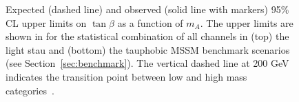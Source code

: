 \begin{figure}[!hp]
     \begin{center}
	
    \end{center}
    \caption{Expected (dashed line) and observed (solid line with markers) 95\% CL upper limits on $\tan\beta$ as a function of $m_A$. 
	The upper limits are shown in for the statistical combination of all channels in (top) the light stau and (bottom) the tauphobic
	MSSM benchmark scenarios (see Section~\ref{sec:benchmark}). 
	The vertical dashed line at 200 GeV indicates the transition point between low and high mass categories~\cite{yuppy}.} 

\end{figure}





